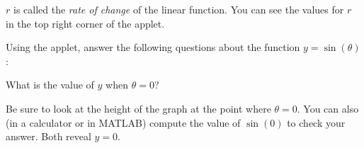 \documentclass{ximera}
\begin{document}
$r$ is called the \textit{rate of change} of the linear function. You can see the values for $r$ in the top right corner of the applet. 

Using the applet, answer the following questions about the function $y=\sin(\theta)$:

\begin{question}
    \begin{prompt} 
    What is the value of $y$ when $\theta=0$? 
    \begin{multipleChoice}
        \choice{$\pi$}
    \end{multipleChoice}
    \begin{feedback}
        Be sure to look at the height of the graph at the point where $\theta=0$. You can also (in a calculator or in MATLAB) compute the value of $\sin(0)$ to check your answer. Both reveal $y=0$.
    \end{feedback}
    \end{prompt}
\end{question}
 
\end{document}
